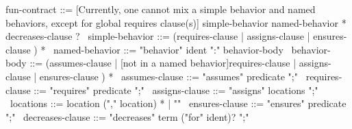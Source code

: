 \begin{syntax}
  fun-contract ::= {[Currently, one cannot mix a simple behavior and
    named behaviors, except for global requires clause(s)]
                simple-behavior named-behavior * decreases-clause ?}
  \
  simple-behavior ::= (requires-clause | assigns-clause |
  ensures-clause ) *
  \
  named-behavior ::= "behavior" ident ":" behavior-body
  \
  behavior-body ::= (assumes-clause |
                     {[not in a named behavior]requires-clause}
                    | assigns-clause |
                      ensures-clause ) *
              \
  assumes-clause ::= "assumes" predicate ";"
  \
  requires-clause ::= "requires" predicate ";"
  \
  assigns-clause ::= "assigns" locations ";"
  \
  locations ::= location ("," location) * | "\nothing"
  \
  ensures-clause ::= "ensures" predicate ";"
  \
  decreases-clause ::= "decreases" term ("for" ident)? ";"
\end{syntax}
